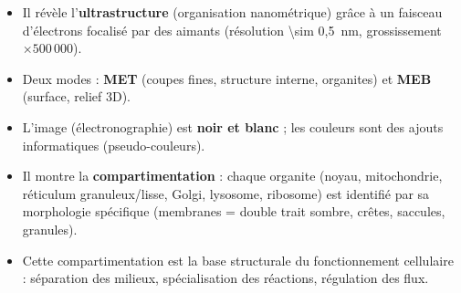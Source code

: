 \documentclass[11pt]{article}
\begin{document}
\begin{aretenir}
\begin{itemize}
    \item Il révèle l'\textbf{ultrastructure} (organisation nanométrique) grâce à un faisceau d'électrons focalisé par des aimants (résolution \SI{\sim 0,5}{nm}, grossissement $\times 500\,000$).
    \item Deux modes : \textbf{MET} (coupes fines, structure interne, organites) et \textbf{MEB} (surface, relief 3D).
    \item L'image (électronographie) est \textbf{noir et blanc} ; les couleurs sont des ajouts informatiques (pseudo-couleurs).
    \item Il montre la \textbf{compartimentation} : chaque organite (noyau, mitochondrie, réticulum granuleux/lisse, Golgi, lysosome, ribosome) est identifié par sa morphologie spécifique (membranes = double trait sombre, crêtes, saccules, granules).
    \item Cette compartimentation est la base structurale du fonctionnement cellulaire : séparation des milieux, spécialisation des réactions, régulation des flux.
\end{itemize}
\end{aretenir}
\end{document}
